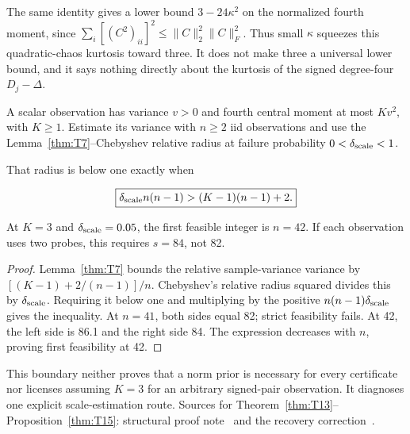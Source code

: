 The same identity gives a lower bound $3-24\kappa^2$ on the normalized fourth moment, since $\sum_i[(C^2)_{ii}]^2\le\|C\|_2^2\|C\|_F^2$. Thus small $\kappa$ squeezes this quadratic-chaos kurtosis toward three. It does not make three a universal lower bound, and it says nothing directly about the kurtosis of the signed degree-four $D_j-\Delta$.

\begin{proposition}\label{thm:T15}
A scalar observation has variance $v>0$ and fourth central moment at most $Kv^2$, with $K\ge1$. Estimate its variance with $n\ge2$ iid observations and use the Lemma~\ref{thm:T7}--Chebyshev relative radius at failure probability $0<\delta_{\rm scale}<1$.


That radius is below one exactly when


\begin{equation}
\boxed{\delta_{\rm scale}n(n-1)>(K-1)(n-1)+2.}
\end{equation}


At $K=3$ and $\delta_{\rm scale}=0.05$, the first feasible integer is $n=42$. If each observation uses two probes, this requires $s=84$, not 82.


\end{proposition}
\begin{proof}
Lemma~\ref{thm:T7} bounds the relative sample-variance variance by $[(K-1)+2/(n-1)]/n$. Chebyshev's relative radius squared divides this by $\delta_{\rm scale}$. Requiring it below one and multiplying by the positive $n(n-1)\delta_{\rm scale}$ gives the inequality. At $n=41$, both sides equal 82; strict feasibility fails. At 42, the left side is 86.1 and the right side 84. The expression decreases with $n$, proving first feasibility at 42.

\end{proof}


This boundary neither proves that a norm prior is necessary for every certificate nor licenses assuming $K=3$ for an arbitrary signed-pair observation. It diagnoses one explicit scale-estimation route. Sources for Theorem~\ref{thm:T13}--Proposition~\ref{thm:T15}: structural proof note~\cite{project2026} and the recovery correction~\cite{project2026}.

